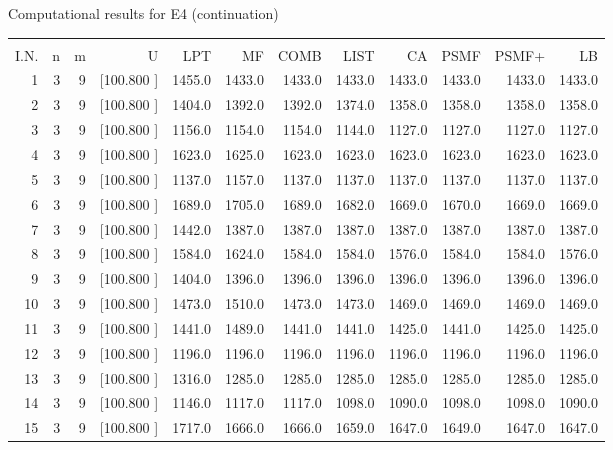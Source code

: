 \documentclass[12pt,a4paper]{article}
\begin{document}
\newpage
\begin{center}
 Computational results for E4 (continuation) {\tiny
\begin{tabular}{r r r r r r r r r r r r}\hline
    &   &   &          &        &        &        &        &        &        &        &       \\[-0.1in]
  I.N.  &  n  &  m  &  U  &  LPT  &  MF  &  COMB  &  LIST  &  CA  & PSMF &PSMF+ & LB \\[0.03in]
\hline
   1&  3&  9&[100.800   ]&  1455.0&  1433.0&  1433.0&  1433.0&  1433.0&  1433.0&  1433.0&  1433.0\\[-0.02in]
   2&  3&  9&[100.800   ]&  1404.0&  1392.0&  1392.0&  1374.0&  1358.0&  1358.0&  1358.0&  1358.0\\[-0.02in]
   3&  3&  9&[100.800   ]&  1156.0&  1154.0&  1154.0&  1144.0&  1127.0&  1127.0&  1127.0&  1127.0\\[-0.02in]
   4&  3&  9&[100.800   ]&  1623.0&  1625.0&  1623.0&  1623.0&  1623.0&  1623.0&  1623.0&  1623.0\\[-0.02in]
   5&  3&  9&[100.800   ]&  1137.0&  1157.0&  1137.0&  1137.0&  1137.0&  1137.0&  1137.0&  1137.0\\[-0.02in]
   6&  3&  9&[100.800   ]&  1689.0&  1705.0&  1689.0&  1682.0&  1669.0&  1670.0&  1669.0&  1669.0\\[-0.02in]
   7&  3&  9&[100.800   ]&  1442.0&  1387.0&  1387.0&  1387.0&  1387.0&  1387.0&  1387.0&  1387.0\\[-0.02in]
   8&  3&  9&[100.800   ]&  1584.0&  1624.0&  1584.0&  1584.0&  1576.0&  1584.0&  1584.0&  1576.0\\[-0.02in]
   9&  3&  9&[100.800   ]&  1404.0&  1396.0&  1396.0&  1396.0&  1396.0&  1396.0&  1396.0&  1396.0\\[-0.02in]
  10&  3&  9&[100.800   ]&  1473.0&  1510.0&  1473.0&  1473.0&  1469.0&  1469.0&  1469.0&  1469.0\\[-0.02in]
  11&  3&  9&[100.800   ]&  1441.0&  1489.0&  1441.0&  1441.0&  1425.0&  1441.0&  1425.0&  1425.0\\[-0.02in]
  12&  3&  9&[100.800   ]&  1196.0&  1196.0&  1196.0&  1196.0&  1196.0&  1196.0&  1196.0&  1196.0\\[-0.02in]
  13&  3&  9&[100.800   ]&  1316.0&  1285.0&  1285.0&  1285.0&  1285.0&  1285.0&  1285.0&  1285.0\\[-0.02in]
  14&  3&  9&[100.800   ]&  1146.0&  1117.0&  1117.0&  1098.0&  1090.0&  1098.0&  1098.0&  1090.0\\[-0.02in]
  15&  3&  9&[100.800   ]&  1717.0&  1666.0&  1666.0&  1659.0&  1647.0&  1649.0&  1647.0&  1647.0\\[-0.02in]

\end{tabular}}
\end{center}
\end{document}
